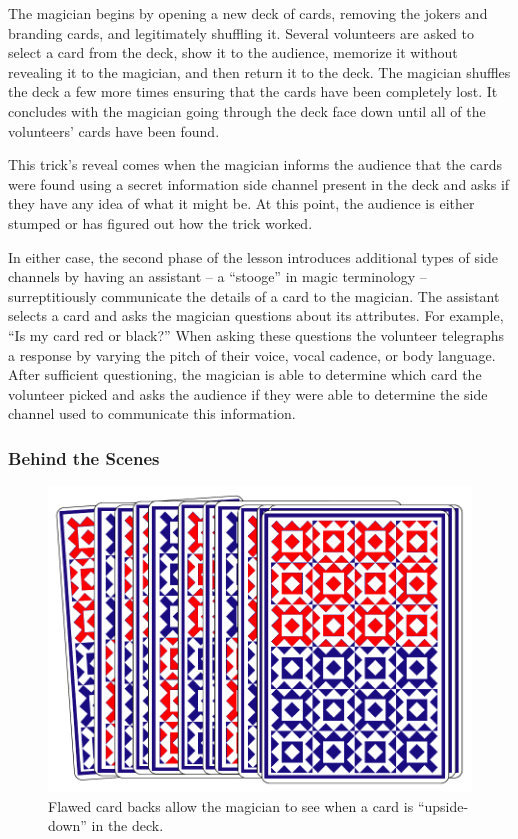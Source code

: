 The magician begins by opening a new deck of cards, removing the jokers and
branding cards, and legitimately shuffling it.  Several volunteers are
asked to
select a card from the deck, show it to the audience, memorize it without
revealing it to the magician, and then return it to the deck.
The magician shuffles the deck a few more times ensuring that the cards
have
been completely lost.
It concludes with the magician going through the deck face down
until all of the volunteers' cards have been found.

This trick's reveal comes when the magician informs the audience
that the cards were found using a secret
information side channel present in the
deck and asks if they have any idea of what it might be.
At this point, the audience is either stumped or has figured out how the trick
worked.

In either case,  the second phase of the lesson
introduces additional types of side channels
by having an assistant
-- a ``stooge'' in magic terminology --
surreptitiously
communicate the details of a card
to the magician.
The assistant selects a card and asks the magician questions about its
attributes.
For example, ``Is my card red or black?''
When asking these questions the volunteer
telegraphs a response
by varying the pitch of their voice, vocal cadence, or body language.
After sufficient questioning, the magician is able to determine which card the
volunteer picked and asks the audience if they were able to determine the side
channel used to communicate this information.

\subsubsection{Behind the Scenes}

\begin{figure}[H]
\centering
\includegraphics[scale=.7]{images/Trick2}
\caption{Flawed card backs allow the magician to see when a card is
  ``upside-down'' in the deck.}
\label{fig:trick2}
\end{figure}

